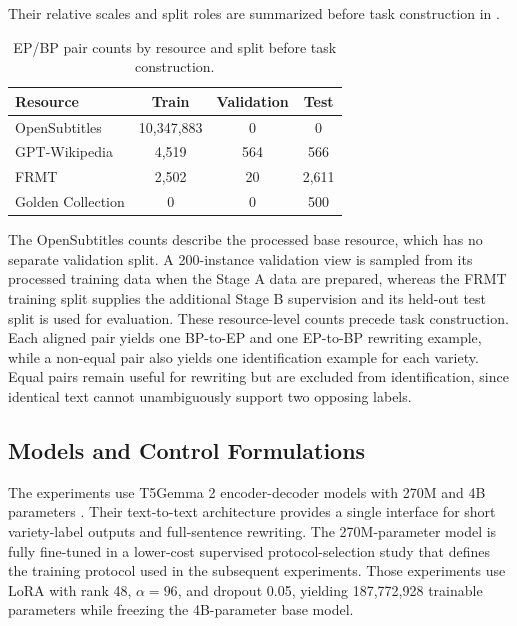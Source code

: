 \documentclass[acmtog,nonacm]{acmart}
\begin{document}
Their relative scales and split roles are summarized before task construction
in .

\begin{table}[H]
  \centering
  \small
  \renewcommand{\arraystretch}{1.12}
  \setlength{\tabcolsep}{4pt}
  \caption{EP/BP pair counts by resource and split before task construction.}
  \label{tab:resource-pair-counts}
  \begin{tabular}{@{}lccc@{}}
    \toprule
    \textbf{Resource} & \textbf{Train} & \textbf{Validation} & \textbf{Test} \\
    \midrule
    OpenSubtitles & 10,347,883 & 0 & 0 \\
    GPT-Wikipedia & 4,519 & 564 & 566 \\
    FRMT & 2,502 & 20 & 2,611 \\
    Golden Collection & 0 & 0 & 500 \\
    \bottomrule
  \end{tabular}
\end{table}

The OpenSubtitles counts describe the processed base resource, which has no
separate validation split. A 200-instance validation view is sampled from its
processed training data when the Stage A data are prepared, whereas the FRMT
training split supplies the additional Stage B supervision and its held-out
test split is used for evaluation. These resource-level counts precede task
construction. Each aligned pair yields one BP-to-EP and one EP-to-BP rewriting
example, while a non-equal pair also yields one identification example for each
variety. Equal pairs remain useful for rewriting but are excluded from identification,
since identical text cannot unambiguously support two opposing labels.


\subsection{Models and Control Formulations}
\label{sec:task-control-formulations}

The experiments use T5Gemma 2 encoder-decoder models with 270M and 4B
parameters \citep{zhang2025t5gemma2seeingreading}. Their text-to-text
architecture provides a single interface for short variety-label outputs and
full-sentence rewriting. The 270M-parameter model is fully fine-tuned in a
lower-cost supervised protocol-selection study that defines the training
protocol used in the subsequent experiments. Those experiments use LoRA \citep{hu2022lora} with rank 48, \(\alpha=96\), and dropout 0.05, yielding 187,772,928 trainable parameters while freezing the 4B-parameter base model.
\end{document}
